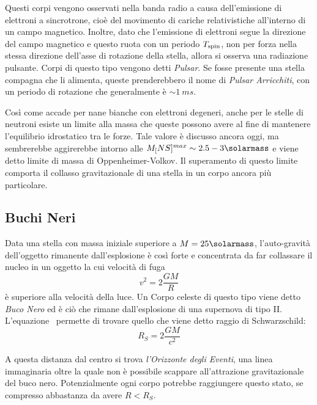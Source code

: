 Questi corpi vengono osservati nella banda radio a causa dell'emissione di elettroni a sincrotrone, cioè del movimento di cariche relativistiche all'interno di un campo magnetico. Inoltre, dato che l'emissione di elettroni segue la direzione del campo magnetico e questo ruota con un periodo $T_{\mbox{\scriptsize{spin}}}$, non per forza nella stessa direzione dell'asse di rotazione della stella, allora si osserva una radiazione pulsante. Corpi di questo tipo vengono detti \textit{Pulsar}. Se fosse presente una stella compagna che li alimenta, queste prenderebbero il nome di \textit{Pulsar Arricchiti}, con un periodo di rotazione che generalmente è $\sim \SI{1}{ms}$.

Così come accade per nane bianche con elettroni degeneri, anche per le stelle di neutroni esiste un limite alla massa che queste possono avere al fine di mantenere l'equilibrio idrostatico tra le forze. Tale valore è discusso ancora oggi, ma sembrerebbe aggirerebbe intorno alle $M_[NS]^{max} \sim 2.5 - 3 \si{\solarmass}$ e viene detto limite di massa di Oppenheimer-Volkov. Il superamento di questo limite comporta il collasso gravitazionale di una stella in un corpo ancora più particolare.
\subsection{Buchi Neri}\label{black-holes}

Data una stella con massa iniziale superiore a $M = 25\si{\solarmass}$, l'auto-gravità dell'oggetto rimanente dall'esplosione è così forte e concentrata da far collassare il nucleo in un oggetto la cui velocità di fuga
\begin{equation}\label{eq:fuga}
    v^2 = 2 \frac{GM}{R}
\end{equation}
è superiore alla velocità della luce. Un Corpo celeste di questo tipo viene detto \textit{Buco Nero} ed è ciò che rimane dall'esplosione di una supernova di tipo II. L'equazione~ permette di trovare quello che viene detto raggio di Schwarzschild:
\begin{equation}\label{eq:schwarzschild}
    R_S = 2 \frac{GM}{c^2}
\end{equation}

A questa distanza dal centro si trova \textit{l'Orizzonte degli Eventi}, una linea immaginaria oltre la quale non è possibile scappare all'attrazione gravitazionale del buco nero. Potenzialmente ogni corpo potrebbe raggiungere questo stato, se compresso abbastanza da avere $R<R_S$.

